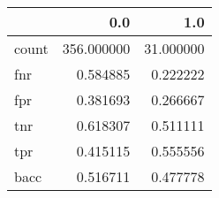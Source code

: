 \begin{tabular}{lrr}
\toprule
{} &         0.0 &        1.0 \\
\midrule
count &  356.000000 &  31.000000 \\
fnr   &    0.584885 &   0.222222 \\
fpr   &    0.381693 &   0.266667 \\
tnr   &    0.618307 &   0.511111 \\
tpr   &    0.415115 &   0.555556 \\
bacc  &    0.516711 &   0.477778 \\
\bottomrule
\end{tabular}
